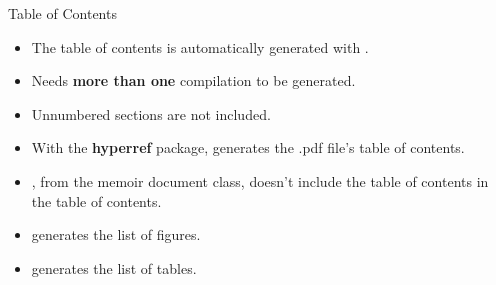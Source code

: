 \begin{frame}[fragile,c]{Table of Contents}
	
	\begin{itemize}
		\item The table of contents is automatically generated with .
		\item Needs \textbf{more than one} compilation to be generated.
		\item Unnumbered sections are not included.
		\item With the \textbf{hyperref} package,  generates the .pdf file's
		table of contents.
		\pause
		\item {}, from the memoir document class, doesn't include the table of contents in the table of contents.
		\pause
		\item {} generates the list of figures.
		\item {} generates the list of tables.
	\end{itemize}

\end{frame}

